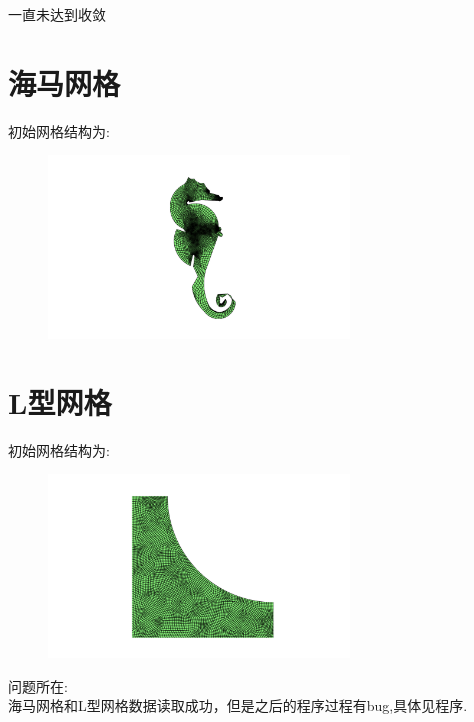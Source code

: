 \documentclass[12pt]{article}
\begin{document}
\begin{CJK}{UTF8}{gkai}
  一直未达到收敛 \\ 
\section{海马网格}
    初始网格结构为:\\        
    \begin{figure}[H]
    	\centering
    	\includegraphics[width=8cm]{haima.png}
    	\caption{}  		
    \end{figure}    
\section{L型网格}
初始网格结构为:\\        
\begin{figure}[H]
	\centering
	\includegraphics[width=8cm]{L.png}
	\caption{}  		
\end{figure}  
问题所在:\\

海马网格和L型网格数据读取成功，但是之后的程序过程有bug,具体见程序.\\  
\end{CJK}
\end{document}
